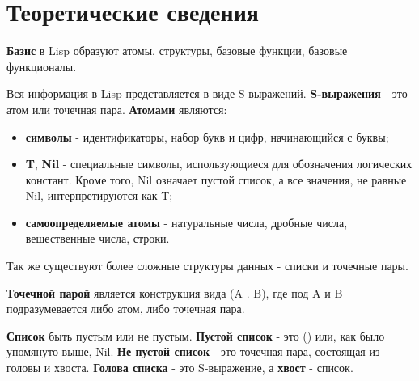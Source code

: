 \chapter{Теоретические сведения}
\textbf{Базис} в Lisp образуют атомы, структуры, базовые функции, базовые функционалы.

Вся информация в Lisp представляется в виде S-выражений. \textbf{S-выражения} - это атом или точечная пара.
\textbf{Атомами} являются:
\begin{itemize}
    \item \textbf{символы} - идентификаторы, набор букв и цифр, начинающийся с буквы;
    \item \textbf{T}, \textbf{Nil} - специальные символы, использующиеся для обозначения логических констант. Кроме того, Nil означает пустой список, а все значения, не равные Nil, интерпретируются как T;
    \item \textbf{самоопределяемые атомы} - натуральные числа, дробные числа, вещественные числа, строки.
\end{itemize}

Так же существуют более сложные структуры данных - списки и точечные пары.

\textbf{Точечной парой} является конструкция вида (A . B), где под A и B подразумевается либо атом, либо точечная пара.

\textbf{Список} быть пустым или не пустым. \textbf{Пустой список} - это () или, как было упомянуто выше, Nil. \textbf{Не пустой список} - это точечная пара, состоящая из головы и хвоста. \textbf{Голова списка} - это S-выражение, а \textbf{хвост} - список.

